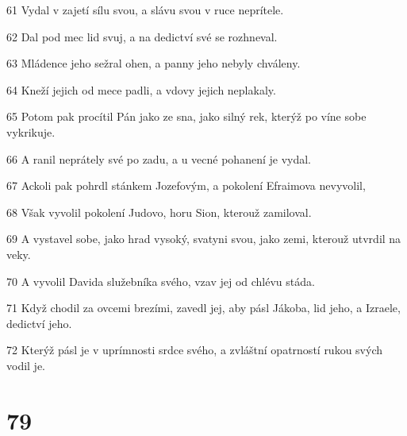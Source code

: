 \par 61 Vydal v zajetí sílu svou, a slávu svou v ruce neprítele.
\par 62 Dal pod mec lid svuj, a na dedictví své se rozhneval.
\par 63 Mládence jeho sežral ohen, a panny jeho nebyly chváleny.
\par 64 Kneží jejich od mece padli, a vdovy jejich neplakaly.
\par 65 Potom pak procítil Pán jako ze sna, jako silný rek, kterýž po víne sobe vykrikuje.
\par 66 A ranil neprátely své po zadu, a u vecné pohanení je vydal.
\par 67 Ackoli pak pohrdl stánkem Jozefovým, a pokolení Efraimova nevyvolil,
\par 68 Však vyvolil pokolení Judovo, horu Sion, kterouž zamiloval.
\par 69 A vystavel sobe, jako hrad vysoký, svatyni svou, jako zemi, kterouž utvrdil na veky.
\par 70 A vyvolil Davida služebníka svého, vzav jej od chlévu stáda.
\par 71 Když chodil za ovcemi brezími, zavedl jej, aby pásl Jákoba, lid jeho, a Izraele, dedictví jeho.
\par 72 Kterýž pásl je v uprímnosti srdce svého, a zvláštní opatrností rukou svých vodil je.

\chapter{79}

